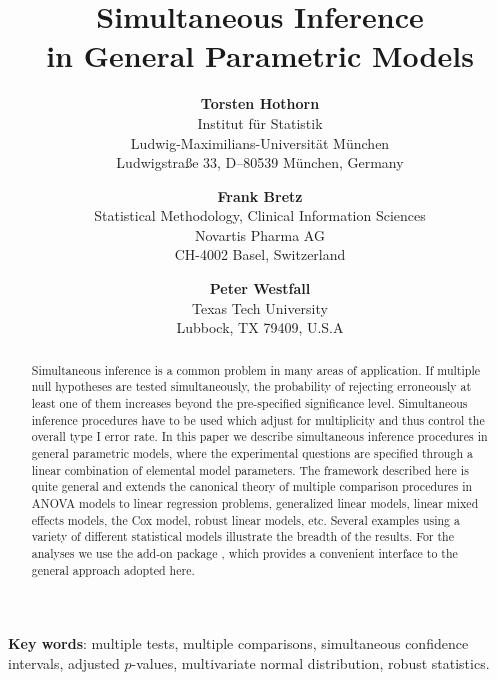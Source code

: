 \documentclass[12pt,a4paper]{article}
\begin{document}
\title{Simultaneous Inference \\
in General Parametric Models}
\author{\textbf{Torsten Hothorn} \\
Institut f{\"u}r Statistik \\
Ludwig-Maximilians-Universit{\"a}t M{\"u}nchen \\
Ludwigstra{\ss }e 33, D--80539 M{\"u}nchen, Germany\\
\and \textbf{Frank Bretz} \\
Statistical Methodology, Clinical Information Sciences\\
Novartis Pharma AG \\
CH-4002 Basel, Switzerland \\
\and \textbf{Peter Westfall} \\
Texas Tech University \\
Lubbock, TX 79409, U.S.A}
\maketitle

\begin{abstract}
Simultaneous inference is a common problem in many areas of application. If
multiple null hypotheses are tested simultaneously, the probability of
rejecting erroneously at least one of them increases beyond the
pre-specified significance level. Simultaneous inference procedures have to
be used which adjust for multiplicity and thus control the overall type I
error rate. In this paper we describe simultaneous inference procedures in
general parametric models, where the experimental questions are specified
through a linear combination of elemental model parameters. The framework
described here is quite general and extends the canonical theory of multiple
comparison procedures in ANOVA models to linear regression problems,
generalized linear models, linear mixed effects models, the Cox model,
robust linear models, etc. Several examples using a variety of different
statistical models illustrate the breadth of the results. For the analyses
we use the \RR{} add-on package , which provides a
convenient interface to the general approach adopted here.
\end{abstract}

\thispagestyle{empty} \setcounter{page}{0}

\textbf{Key words}: multiple tests, multiple comparisons, simultaneous
confidence intervals, \newline
adjusted $p$-values, multivariate normal distribution, robust statistics.
\end{document}
